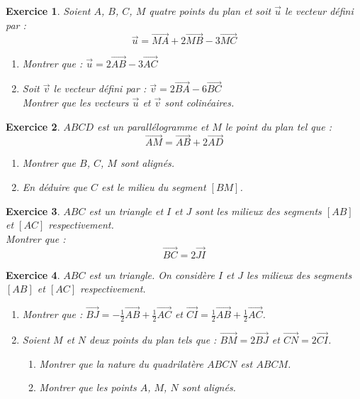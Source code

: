 \documentclass[12pt,a4paper]{article}
\theoremstyle{mystyle}
\newtheorem{exo}{Exercice}
\begin{document}
\begin{multicols*}{2}
\begin{exo}
   Soient $A$, $B$, $C$, $M$ quatre points du plan et soit $\overrightarrow{u}$ le vecteur défini par :
$$
\overrightarrow{u} = \overrightarrow{MA} + 2\overrightarrow{MB} - 3\overrightarrow{MC}
$$
\begin{enumerate}
    \item Montrer que : $\overrightarrow{u} = 2\overrightarrow{AB} - 3\overrightarrow{AC}$
    \item Soit $\overrightarrow{v}$ le vecteur défini par : $\overrightarrow{v} = 2\overrightarrow{BA} - 6\overrightarrow{BC}$ \\
    Montrer que les vecteurs $\overrightarrow{u}$ et $\overrightarrow{v}$ sont colinéaires.
\end{enumerate}
\end{exo}
\columnbreak 
\begin{exo}
$ABCD$ est un parallélogramme et $M$ le point du plan tel que :
\[
\overrightarrow{AM} = \overrightarrow{AB} + 2\overrightarrow{AD}
\]
\begin{enumerate}
    \item Montrer que $B$, $C$, $M$ sont alignés.
    \item En déduire que $C$ est le milieu du segment $[BM]$.
\end{enumerate}
\end{exo}

\begin{exo}
$ABC$ est un triangle et $I$ et $J$ sont les milieux des segments $[AB]$ et $[AC]$ respectivement. \\
Montrer que :
\[
\overrightarrow{BC} = 2\overrightarrow{JI}
\]
\end{exo}

\begin{exo}
$ABC$ est un triangle. On considère $I$ et $J$ les milieux des segments $[AB]$ et $[AC]$ respectivement.
\begin{enumerate}
    \item Montrer que : $\overrightarrow{BJ} = -\frac{1}{2}\overrightarrow{AB} + \frac{1}{2}\overrightarrow{AC}$ et $\overrightarrow{CI} = \frac{1}{2}\overrightarrow{AB} + \frac{1}{2}\overrightarrow{AC}$.
    \item Soient $M$ et $N$ deux points du plan tels que : $\overrightarrow{BM} = 2\overrightarrow{BJ}$ et $\overrightarrow{CN} = 2\overrightarrow{CI}$.
    \begin{enumerate}
        \item Montrer que la nature du quadrilatère $ABCN$ est $ABCM$.
        \item Montrer que les points $A$, $M$, $N$ sont alignés.
    \end{enumerate}
\end{enumerate}
\end{exo}


\end{multicols*}
\end{document}
